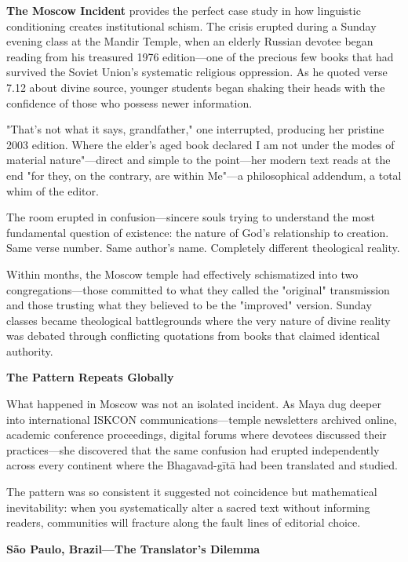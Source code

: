 \documentclass[12pt,twoside]{book}
\begin{document}
\textbf{\textbf{The Moscow Incident}} provides the perfect case study in how linguistic conditioning creates institutional schism. The crisis erupted during a Sunday evening class at the Mandir Temple, when an elderly Russian devotee began reading from his treasured 1976 edition—one of the precious few books that had survived the Soviet Union's systematic religious oppression. As he quoted verse 7.12 about divine source, younger students began shaking their heads with the confidence of those who possess newer information.

"That's not what it says, grandfather," one interrupted, producing her pristine 2003 edition. Where the elder's aged book declared I am not under the modes of material nature"—direct and simple to the point—her modern text reads at the end "for they, on the contrary, are within Me"—a philosophical addendum, a total whim of the editor.

The room erupted in confusion—sincere souls trying to understand the most fundamental question of existence: the nature of God's relationship to creation. Same verse number. Same author's name. Completely different theological reality.

Within months, the Moscow temple had effectively schismatized into two congregations—those committed to what they called the "original" transmission and those trusting what they believed to be the "improved" version. Sunday classes became theological battlegrounds where the very nature of divine reality was debated through conflicting quotations from books that claimed identical authority.


\vspace{0.5cm}
\textbf{The Pattern Repeats Globally}
\vspace{0.2cm}


What happened in Moscow was not an isolated incident. As Maya dug deeper into international ISKCON communications—temple newsletters archived online, academic conference proceedings, digital forums where devotees discussed their practices—she discovered that the same confusion had erupted independently across every continent where the Bhagavad-gītā had been translated and studied.

The pattern was so consistent it suggested not coincidence but mathematical inevitability: when you systematically alter a sacred text without informing readers, communities will fracture along the fault lines of editorial choice.

\textbf{\textbf{São Paulo, Brazil—The Translator's Dilemma}}
\end{document}
